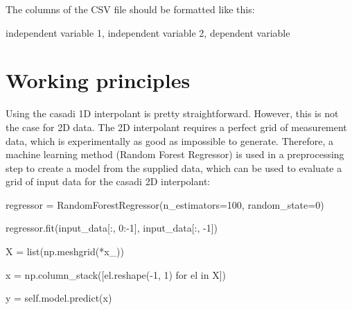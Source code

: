 \documentclass[]{report}
\begin{document}
The columns of the CSV file should be formatted like this:

\begin{python}
independent variable 1, independent variable 2, dependent variable
\end{python}

\section{Working principles}

Using the casadi 1D interpolant is pretty straightforward. However, this is not the case for 2D data. The 2D interpolant requires a perfect grid of measurement data, which is experimentally as good as impossible to generate. Therefore, a machine learning method (Random Forest Regressor) is used in a preprocessing step to create a model from the supplied data, which can be used to evaluate a grid of input data for the casadi 2D interpolant:

\begin{python}
regressor = RandomForestRegressor(n_estimators=100, random_state=0)

regressor.fit(input_data[:, 0:-1], input_data[:, -1])
\end{python}

\begin{python}
X = list(np.meshgrid(*x_))

x = np.column_stack([el.reshape(-1, 1) for el in X])

y = self.model.predict(x)
\end{python}
\end{document}
